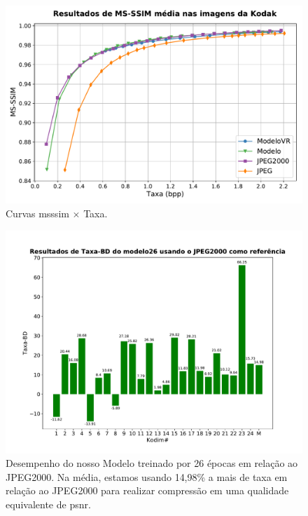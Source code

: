 \begin{figure}[h]
	\centering
	\includegraphics[width=1.0\textwidth]{figuras/comp_codecs_msssim.pdf}
	\caption[Comparações de autocodificadores com o JPEG e JPEG2000 em \acrshort{msssim}]{Curvas \acrshort{msssim} $\times$ Taxa.}  	
	\label{fig:comp_msssim}
\end{figure}



\begin{figure}[h]
	\centering
	\includegraphics[width=1.0\textwidth]{figuras/bd-rate_ref_JPEG2k.pdf}
	\caption[Comparação do modelo26 com JPEG2000 em \acrshort{bdrate}]{Desempenho do nosso Modelo treinado por 26 épocas em relação ao JPEG2000. Na média, estamos usando 14,98\% a mais de taxa em relação ao JPEG2000 para realizar compressão em uma qualidade equivalente de \acrshort{psnr}.}  	
	\label{fig:comp_jp2k}
\end{figure}



